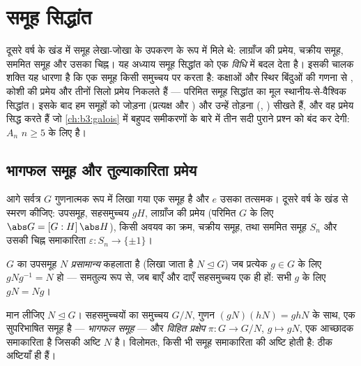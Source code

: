\chapter{समूह सिद्धांत}\label{ch:b3:groups}

दूसरे वर्ष के खंड में समूह लेखा-जोखा के उपकरण के रूप में मिले थे:
लाग्राँज की प्रमेय, चक्रीय समूह, सममित समूह और उसका चिह्न। यह
अध्याय समूह सिद्धांत को एक \emph{विधि} में बदल देता है। इसकी चालक
शक्ति यह धारणा है कि एक समूह किसी समुच्चय पर \emph{} करता
है: कक्षाओं और स्थिर बिंदुओं की गणना से , कोशी की
प्रमेय और तीनों सिलो प्रमेय निकलते हैं --- परिमित समूह सिद्धांत
का मूल स्थानीय-से-वैश्विक सिद्धांत। इसके बाद हम समूहों को जोड़ना
(प्रत्यक्ष और ) और उन्हें तोड़ना (, ) सीखते हैं, और वह प्रमेय सिद्ध करते हैं जो
\cref{ch:b3:galois} में बहुपद समीकरणों के बारे में तीन सदी पुराने प्रश्न को बंद
कर देगी:  $A_n$ $n
\geq 5$ के लिए  है।

\section{भागफल समूह और तुल्याकारिता प्रमेय}

आगे सर्वत्र $G$ गुणनात्मक रूप में लिखा गया एक समूह है और $e$
उसका तत्समक। दूसरे वर्ष के खंड से स्मरण कीजिए: उपसमूह,
सहसमुच्चय $gH$, लाग्राँज की प्रमेय (परिमित $G$ के लिए $\abs G = [G:H]\,\abs H$),
किसी अवयव का क्रम, चक्रीय समूह, तथा सममित समूह $S_n$ और उसकी
चिह्न समाकारिता $\varepsilon \colon S_n \to \{\pm1\}$।

\begin{definition}\label{def:b3:groups:normal}
$G$ का उपसमूह $N$ \emph{प्रसामान्य}
कहलाता है (लिखा जाता है $N \trianglelefteq G$) जब प्रत्येक $g
\in G$ के लिए $gNg^{-1} = N$ हो
--- समतुल्य रूप से, जब बाएँ और दाएँ सहसमुच्चय एक ही हों:
सभी $g$ के लिए $gN =
Ng$।
\end{definition}

\begin{theorem}[भागफल समूह]\label{thm:b3:groups:quotient}
मान लीजिए $N \trianglelefteq G$। सहसमुच्चयों का समुच्चय $G/N$, गुणन $(gN)(hN) = ghN$ के साथ,
एक सुपरिभाषित समूह है --- \emph{भागफल समूह}
--- और \emph{विहित प्रक्षेप} $\pi \colon G \to G/N$, $g \mapsto gN$, एक आच्छादक समाकारिता
है जिसकी अष्टि $N$ है। विलोमतः, किसी भी समूह समाकारिता की
अष्टि  होती है:  ठीक अष्टियाँ ही हैं।
\end{theorem}

